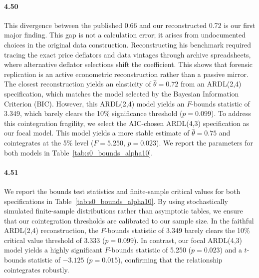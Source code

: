 \paragraph{4.50}
This divergence between the published 0.66 and our reconstructed 0.72 is our first major finding. This gap is not a calculation error; it arises from undocumented choices in the original data construction. Reconstructing his benchmark required tracing the exact price deflators and data vintages through archive spreadsheets, where alternative deflator selections shift the coefficient. This shows that forensic replication is an active econometric reconstruction rather than a passive mirror. The closest reconstruction yields an elasticity of $\hat{\theta}=0.72$ from an ARDL(2,4) specification, which matches the model selected by the Bayesian Information Criterion (BIC). However, this ARDL(2,4) model yields an $F$-bounds statistic of 3.349, which barely clears the 10\% significance threshold ($p=0.099$). To address this cointegration fragility, we select the AIC-chosen ARDL(4,3) specification as our focal model. This model yields a more stable estimate of $\hat{\theta}=0.75$ and cointegrates at the 5\% level ($F=5.250$, $p=0.023$). We report the parameters for both models in Table~\ref{tab:s0_bounds_alpha10}.

\paragraph{4.51}
We report the bounds test statistics and finite-sample critical values for both specifications in Table~\ref{tab:s0_bounds_alpha10}. By using stochastically simulated finite-sample distributions rather than asymptotic tables, we ensure that our cointegration thresholds are calibrated to our sample size. In the faithful ARDL(2,4) reconstruction, the $F$-bounds statistic of 3.349 barely clears the 10\% critical value threshold of 3.333 ($p=0.099$). In contrast, our focal ARDL(4,3) model yields a highly significant $F$-bounds statistic of 5.250 ($p=0.023$) and a $t$-bounds statistic of $-3.125$ ($p=0.015$), confirming that the relationship cointegrates robustly.

